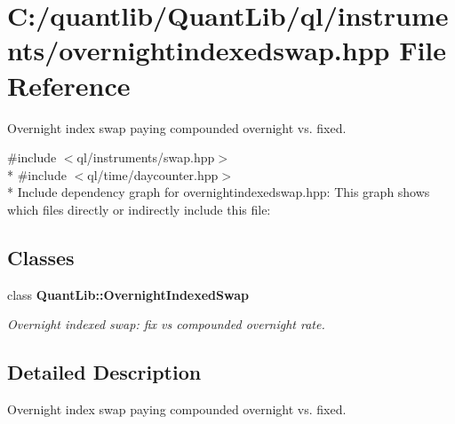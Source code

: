 \section{C\+:/quantlib/\+Quant\+Lib/ql/instruments/overnightindexedswap.hpp File Reference}
\label{overnightindexedswap_8hpp}


Overnight index swap paying compounded overnight vs. fixed.  


{\ttfamily \#include $<$ql/instruments/swap.\+hpp$>$}\\*
{\ttfamily \#include $<$ql/time/daycounter.\+hpp$>$}\\*
Include dependency graph for overnightindexedswap.\+hpp\+:
This graph shows which files directly or indirectly include this file\+:
\subsection*{Classes}
\begin{DoxyCompactItemize}
\item 
class {\bf Quant\+Lib\+::\+Overnight\+Indexed\+Swap}
\begin{DoxyCompactList}\small\item\em Overnight indexed swap\+: fix vs compounded overnight rate. \end{DoxyCompactList}\end{DoxyCompactItemize}


\subsection{Detailed Description}
Overnight index swap paying compounded overnight vs. fixed. 


